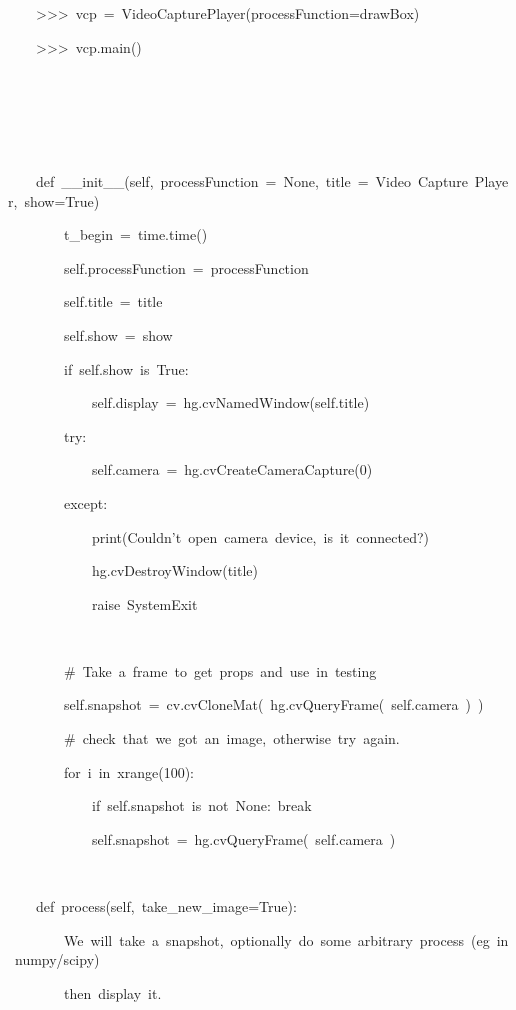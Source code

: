 \documentclass[english]{IEEEtran}
\theoremstyle{plain}
\newenvironment{lyxcode}
{\par\begin{list}{}{
\setlength{\rightmargin}{\leftmargin}
\setlength{\listparindent}{0pt}%
\raggedright
\setlength{\itemsep}{0pt}
\setlength{\parsep}{0pt}
\normalfont\ttfamily}%
 \item[]}
{\end{list}}
\begin{document}
\begin{algorithm*}
\begin{lyxcode}
~~~~>\textcompwordmark{}>\textcompwordmark{}>~vcp~=~VideoCapturePlayer(processFunction=drawBox)

~~~~>\textcompwordmark{}>\textcompwordmark{}>~vcp.main()

~~~~

~~~~\textquotedbl{}\textquotedbl{}\textquotedbl{}

~~~

~~~~def~\_\_init\_\_(self,~processFunction~=~None,~title~=~\textquotedbl{}Video~Capture~Player\textquotedbl{},~show=True)

~~~~~~~~t\_begin~=~time.time()

~~~~~~~~self.processFunction~=~processFunction

~~~~~~~~self.title~=~title

~~~~~~~~self.show~=~show

~~~~~~~~if~self.show~is~True:

~~~~~~~~~~~~self.display~=~hg.cvNamedWindow(self.title)

~~~~~~~~try:

~~~~~~~~~~~~self.camera~=~hg.cvCreateCameraCapture(0)

~~~~~~~~except:

~~~~~~~~~~~~print(\textquotedbl{}Couldn't~open~camera~device,~is~it~connected?\textquotedbl{})

~~~~~~~~~~~~hg.cvDestroyWindow(title)

~~~~~~~~~~~~raise~SystemExit

~~~~~~~~

~~~~~~~~\#~Take~a~frame~to~get~props~and~use~in~testing

~~~~~~~~self.snapshot~=~cv.cvCloneMat(~hg.cvQueryFrame(~self.camera~)~)

~~~~~~~~\#~check~that~we~got~an~image,~otherwise~try~again.

~~~~~~~~for~i~in~xrange(100):

~~~~~~~~~~~~if~self.snapshot~is~not~None:~break

~~~~~~~~~~~~self.snapshot~=~hg.cvQueryFrame(~self.camera~)

~~~~~~~~

~~~~def~process(self,~take\_new\_image=True):

~~~~~~~~\textquotedbl{}\textquotedbl{}\textquotedbl{}We~will~take~a~snapshot,~optionally~do~some~arbitrary~process~(eg~in~numpy/scipy)

~~~~~~~~then~display~it.

~~~~~~~~\textquotedbl{}\textquotedbl{}\textquotedbl{}


\end{lyxcode}
\end{algorithm*}
\end{document}
